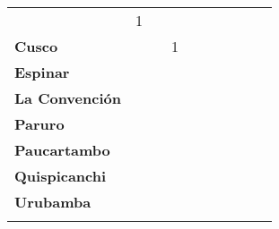\begin{tabular}{lccccccccc}
	&1
	&\cellcolor[HTML]{FCC46C}
	&\cellcolor[HTML]{FCC46C}
	&\cellcolor[HTML]{FCC46C}
	&\cellcolor[HTML]{FCC46C}
	&\cellcolor[HTML]{FCC46C}
	&\cellcolor[HTML]{FCC46C}\\
	\textbf{Cusco}     												
	&\cellcolor[HTML]{FCC46C}
	&\cellcolor[HTML]{FCC46C}
	&1
	&\cellcolor[HTML]{FCC46C}
	&\cellcolor[HTML]{FCC46C}
	&\cellcolor[HTML]{FCC46C}
	&\cellcolor[HTML]{FCC46C}
	&\cellcolor[HTML]{FCC46C}\\								
	\textbf{Espinar}       					             							
	&\cellcolor[HTML]{FCC46C}					
	&\cellcolor[HTML]{FCC46C}
	&\cellcolor[HTML]{FCC46C}					
	&\cellcolor[HTML]{FCC46C}
	&\cellcolor[HTML]{FCC46C}					
	&\cellcolor[HTML]{FCC46C}
	&\cellcolor[HTML]{FCC46C}
	&\cellcolor[HTML]{FCC46C}\\	
	\textbf{La Convención}      													
	&\cellcolor[HTML]{FCC46C}
	&\cellcolor[HTML]{FCC46C}
	&\cellcolor[HTML]{FCC46C}
	&\cellcolor[HTML]{FCC46C}
	&\cellcolor[HTML]{FCC46C}
	&\cellcolor[HTML]{FCC46C}
	&\cellcolor[HTML]{FCC46C}
	&\cellcolor[HTML]{FCC46C}\\	
	\textbf{Paruro}                            					
	&\cellcolor[HTML]{FCC46C}					
	&\cellcolor[HTML]{FCC46C}					
	&\cellcolor[HTML]{FCC46C}					
	&\cellcolor[HTML]{FCC46C}					
	&\cellcolor[HTML]{FCC46C}
	&\cellcolor[HTML]{FCC46C} 					
	&\cellcolor[HTML]{FCC46C}
	&\cellcolor[HTML]{FCC46C}\\
	\textbf{Paucartambo}               		                       					
	&\cellcolor[HTML]{FCC46C}					
	&\cellcolor[HTML]{FCC46C}
	&\cellcolor[HTML]{FCC46C}					
	&\cellcolor[HTML]{FCC46C}
	&\cellcolor[HTML]{FCC46C}					
	&\cellcolor[HTML]{FCC46C}
	&\cellcolor[HTML]{FCC46C}
	&\cellcolor[HTML]{FCC46C}\\
	\textbf{Quispicanchi}     															
	&\cellcolor[HTML]{FCC46C}
	&\cellcolor[HTML]{FCC46C}
	&\cellcolor[HTML]{FCC46C}
	&\cellcolor[HTML]{FCC46C}
	&\cellcolor[HTML]{FCC46C}
	&\cellcolor[HTML]{FCC46C}
	&\cellcolor[HTML]{FCC46C}
	&\cellcolor[HTML]{FCC46C}\\
	\textbf{Urubamba}  																
	&\cellcolor[HTML]{FCC46C}
	&\cellcolor[HTML]{FCC46C}
	&\cellcolor[HTML]{FCC46C}
	&\cellcolor[HTML]{FCC46C}
	&\cellcolor[HTML]{FCC46C}
	&\cellcolor[HTML]{FCC46C}
	&\cellcolor[HTML]{FCC46C}
	&\cellcolor[HTML]{FCC46C}\\						
	&\multicolumn{1}{l}{}                       &\multicolumn{1}{l}{}            &\multicolumn{1}{l}{}                         
	&\multicolumn{1}{l}{}                       &\multicolumn{1}{l}{}            &\multicolumn{1}{l}{}                       &\multicolumn{1}{l}{}                       &\multicolumn{1}{l}{}            			    
\end{tabular}